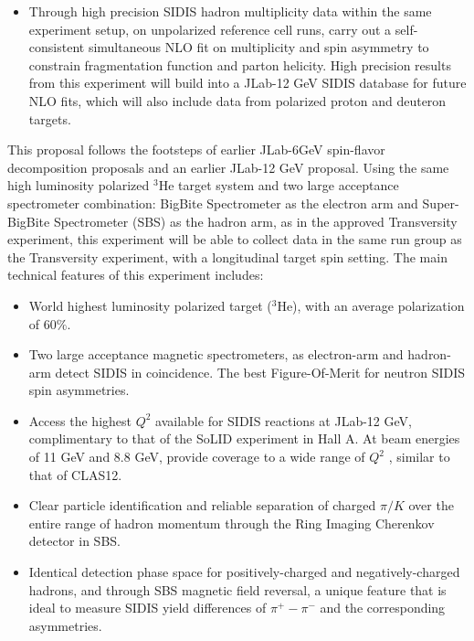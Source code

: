 \begin{itemize}
\item { Through high precision SIDIS hadron multiplicity data  within the same experiment setup, on  unpolarized reference cell runs,        carry out a self-consistent simultaneous NLO fit on multiplicity and spin asymmetry to  constrain fragmentation function and parton helicity.    High precision results from this experiment will build into a JLab-12 GeV SIDIS database for future NLO fits, which will also include data from polarized proton and deuteron targets.}
\end{itemize}

This proposal follows the footsteps of earlier JLab-6GeV spin-flavor decomposition proposals 
and an earlier JLab-12 GeV proposal.
Using the same high luminosity polarized $^3$He target system and two large acceptance spectrometer combination: BigBite Spectrometer as the electron arm and Super-BigBite Spectrometer (SBS) as the hadron arm,  as in the approved Transversity experiment,  this experiment will be able to collect data in the same run group as the Transversity experiment,  with a longitudinal target spin setting.  The main technical features of this experiment includes:

\begin{itemize}
\item {World highest luminosity polarized  target ($^3$He), with an average polarization of 60$\%$.  }
\item {Two large acceptance magnetic spectrometers, as electron-arm and hadron-arm detect SIDIS in coincidence. The best Figure-Of-Merit for neutron SIDIS spin asymmetries.}
\item{Access the highest $Q^2$ available for SIDIS reactions at  JLab-12 GeV,   complimentary to that of the  SoLID experiment in  Hall A.  At beam energies  of 11 GeV and 8.8 GeV,  provide coverage to a wide range of $Q^2$ , similar to that of CLAS12. }
 \item{Clear particle identification and reliable separation of charged $\pi/K$ over the entire range of hadron momentum through the Ring Imaging Cherenkov detector in SBS.}
  \item{Identical detection phase space for positively-charged  and negatively-charged hadrons, and through SBS magnetic field reversal, a unique feature that is ideal to measure SIDIS yield differences of $\pi^+ -\pi^-$ and the corresponding asymmetries.}  
\end{itemize}

